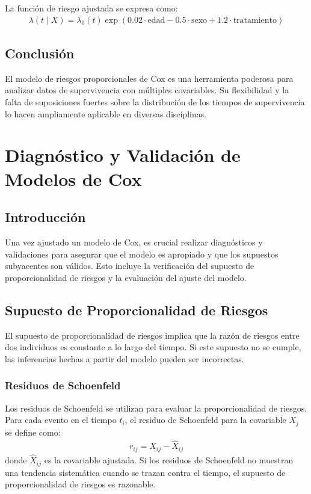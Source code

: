\documentclass[a4paper]{report} %
\begin{document}
La funci\'on de riesgo ajustada se expresa como:
\begin{eqnarray*}
\lambda(t \mid X) = \lambda_0(t) \exp(0.02 \cdot \text{edad} - 0.5 \cdot \text{sexo} + 1.2 \cdot \text{tratamiento})
\end{eqnarray*}

\section{Conclusi\'on}
El modelo de riesgos proporcionales de Cox es una herramienta poderosa para analizar datos de supervivencia con m\'ultiples covariables. Su flexibilidad y la falta de suposiciones fuertes sobre la distribuci\'on de los tiempos de supervivencia lo hacen ampliamente aplicable en diversas disciplinas.



\chapter{Diagnóstico y Validación de Modelos de Cox}

\section{Introducci\'on}
Una vez ajustado un modelo de Cox, es crucial realizar diagn\'osticos y validaciones para asegurar que el modelo es apropiado y que los supuestos subyacentes son válidos. Esto incluye la verificaci\'on del supuesto de proporcionalidad de riesgos y la evaluaci\'on del ajuste del modelo.

\section{Supuesto de Proporcionalidad de Riesgos}
El supuesto de proporcionalidad de riesgos implica que la raz\'on de riesgos entre dos individuos es constante a lo largo del tiempo. Si este supuesto no se cumple, las inferencias hechas a partir del modelo pueden ser incorrectas.

\subsection{Residuos de Schoenfeld}
Los residuos de Schoenfeld se utilizan para evaluar la proporcionalidad de riesgos. Para cada evento en el tiempo $t_i$, el residuo de Schoenfeld para la covariable $X_j$ se define como:
\begin{eqnarray*}
r_{ij} = X_{ij} - \hat{X}_{ij}
\end{eqnarray*}
donde $\hat{X}_{ij}$ es la covariable ajustada. Si los residuos de Schoenfeld no muestran una tendencia sistemática cuando se trazan contra el tiempo, el supuesto de proporcionalidad de riesgos es razonable.
\end{document}
